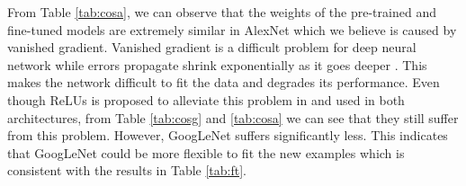 From Table \ref{tab:cosa}, we can observe that the weights of the pre-trained and fine-tuned models are extremely similar in AlexNet which we believe is caused by vanished gradient.
Vanished gradient is a difficult problem for deep neural network while errors propagate shrink exponentially as it goes deeper \cite{glorot2010understanding}. This makes the network difficult to fit the data and degrades its performance. Even though ReLUs is proposed to alleviate this problem in \cite{NairH10} and used in both architectures,
from Table \ref{tab:cosg} and \ref{tab:cosa} we can see that they still suffer from this problem. However, GoogLeNet suffers significantly less. This indicates that GoogLeNet could be more flexible to fit the new examples which is consistent with the results in Table \ref{tab:ft}.


